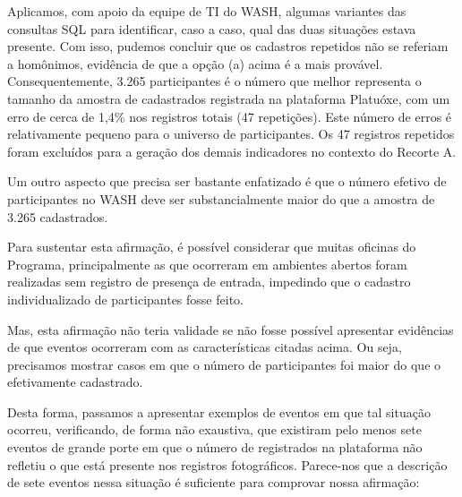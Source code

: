 Aplicamos, com apoio da equipe de TI do WASH, algumas variantes das consultas SQL para identificar, caso a caso, qual das duas situações estava presente. Com isso, pudemos concluir que os cadastros repetidos não se referiam a homônimos, evidência de que a opção (a) acima é a mais provável. Consequentemente, 3.265 participantes é o número que melhor representa o tamanho da amostra de cadastrados registrada na plataforma Platuóxe,  com um erro de cerca de 1,4\% nos registros totais (47 repetições). Este número de erros é relativamente pequeno para o universo de participantes. Os 47 registros repetidos foram excluídos para a geração dos demais indicadores no contexto do Recorte A.


\noindent\begin{center}\mbox{\centering{}}\end{center}


Um outro aspecto que precisa ser bastante enfatizado é que o número efetivo de participantes no WASH deve ser substancialmente maior do que a amostra de 3.265 cadastrados.

Para sustentar esta afirmação, é possível considerar que muitas oficinas do Programa, principalmente as que ocorreram em ambientes abertos foram realizadas sem registro de presença  de entrada, impedindo que o cadastro individualizado de participantes fosse feito.

Mas, esta afirmação não teria validade se não fosse possível apresentar evidências de que eventos ocorreram com as características citadas acima. Ou seja, precisamos mostrar casos em que o número de participantes foi maior do que o efetivamente cadastrado.

Desta forma, passamos a apresentar exemplos de eventos em que tal situação ocorreu, verificando, de forma não exaustiva, que existiram pelo menos sete eventos de grande porte em que o número de registrados na plataforma não refletiu o que está presente nos registros fotográficos. Parece-nos que a descrição de sete eventos nessa situação é suficiente para comprovar nossa afirmação:


